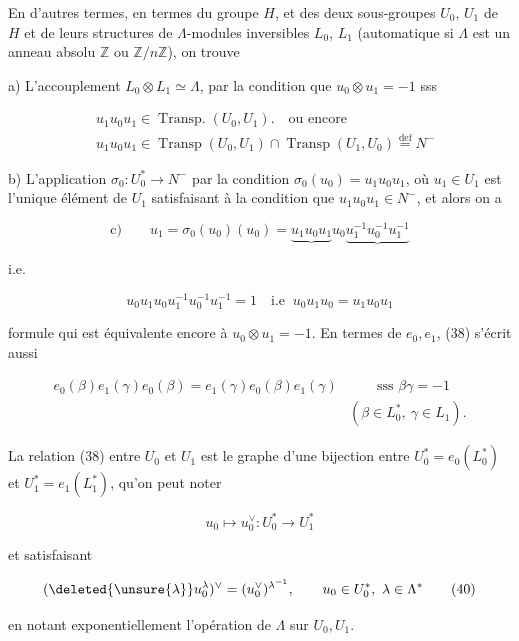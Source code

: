 
En d'autres termes, en termes du groupe $H$, et des deux sous-groupes $U_0$, $U_1$ de $H$ et de leurs structures de $\Lambda$-modules inversibles $L_0$, $L_1$ (automatique si $\Lambda$ est un anneau absolu $\mathbb Z$ ou $\mathbb Z/n\mathbb Z$), on trouve

a) L'accouplement $L_0\otimes L_1\simeq\Lambda$, par la condition que $u_0\otimes u_1=-1$ sss

\[
\begin{aligned}
 &u_1u_0u_1\in\operatorname{Transp.}(U_0,U_1).\quad\text{ou encore}\\
 &u_1u_0u_1\in\operatorname{Transp}(U_0,U_1)\cap\operatorname{Transp}(U_1,U_0)\overset{\mathrm{def}}{=}N^-
\end{aligned}
\]


b) L'application $\sigma_0:U_0^*\longrightarrow N^-$ par la condition $\sigma_0(u_0)=u_1u_0u_1$, où $u_1\in U_1$ est l'unique élément de $U_1$ satisfaisant à la condition que $u_1u_0u_1\in N^-$, et alors on a

\[
\text{c)}\qquad u_1=\sigma_0(u_0)(u_0)=\underbrace{u_1u_0u_1}u_0\underbrace{u_1^{-1}u_0^{-1}u_1^{-1}}
\]

i.e.

\[
 u_0u_1u_0u_1^{-1}u_0^{-1}u_1^{-1}=1\quad\text{i.e }\ u_0u_1u_0=u_1u_0u_1\tag*{(38)}
\]

formule qui est équivalente encore à $u_0\otimes u_1=-1$. En termes de $e_0,e_1$, (38) s'écrit aussi

\[
\begin{aligned}
 e_0(\beta)e_1(\gamma)e_0(\beta)=e_1(\gamma)e_0(\beta)e_1(\gamma)&\qquad\text{sss }\beta\gamma=-1\\
 &(\beta\in L_0^*,\ \gamma\in L_1).
\end{aligned}\tag*{(39)}
\]

La relation (38)  entre $U_0$ et $U_1$ est le graphe d'une bijection entre $U_0^*=e_0(L_0^*)$ et $U_1^*=e_1(L_1^*)$, qu'on peut noter

\[
u_0\longmapsto u_0^\vee:U_0^*\longrightarrow U_1^*
\]

et satisfaisant

\[
(\deleted{\unsure{\lambda}}u_0^\lambda)^\vee=(u_0^\vee)^{\lambda^{-1}},\qquad u_0\in U_0^*,\ \lambda\in\Lambda^*\tag*{(40)}
\]

en notant exponentiellement l'opération  de $\Lambda$ sur $U_0,U_1$.

